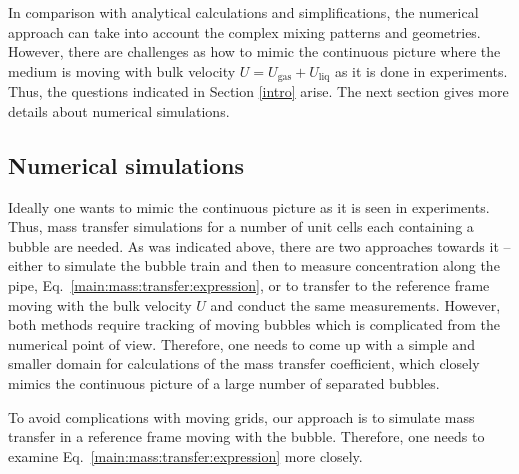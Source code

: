 \documentclass[review,12pt]{elsarticle}
\newcommand{\uliq}{U_{\mathrm{liq}}}
\newcommand{\ugas}{U_{\mathrm{gas}}}
\begin{document}
In comparison with analytical calculations and simplifications, the numerical approach can take into
account the complex mixing patterns and geometries. However, there are challenges as  how to
mimic the continuous picture where the medium is moving with bulk velocity $U=\ugas+\uliq$  as it is done in
experiments. Thus, the questions indicated in Section \ref{intro} arise.  The next section gives more
 details about numerical simulations.
 
\subsection{Numerical simulations}
\label{section:cases}
Ideally one wants to mimic the continuous picture as it is seen in experiments.
Thus, mass transfer simulations for a number of unit cells each containing a bubble are needed. As was
indicated above, there are two approaches towards it -- either to simulate the
bubble train and then to measure concentration along the pipe, Eq.~\ref{main:mass:transfer:expression},
or to transfer to the reference frame moving with the bulk
velocity $U$ and conduct the same measurements. However, both methods require tracking of
moving bubbles which is complicated from the numerical point of view. Therefore, one needs to come
up with a simple and smaller domain for calculations of the mass transfer coefficient, which closely mimics the
continuous picture of a large number of  separated bubbles. 

To avoid complications with moving grids, our
approach is to simulate mass transfer in a reference frame moving with the bubble. Therefore, one
needs to examine  Eq.~\ref{main:mass:transfer:expression} more closely. 
\end{document}

